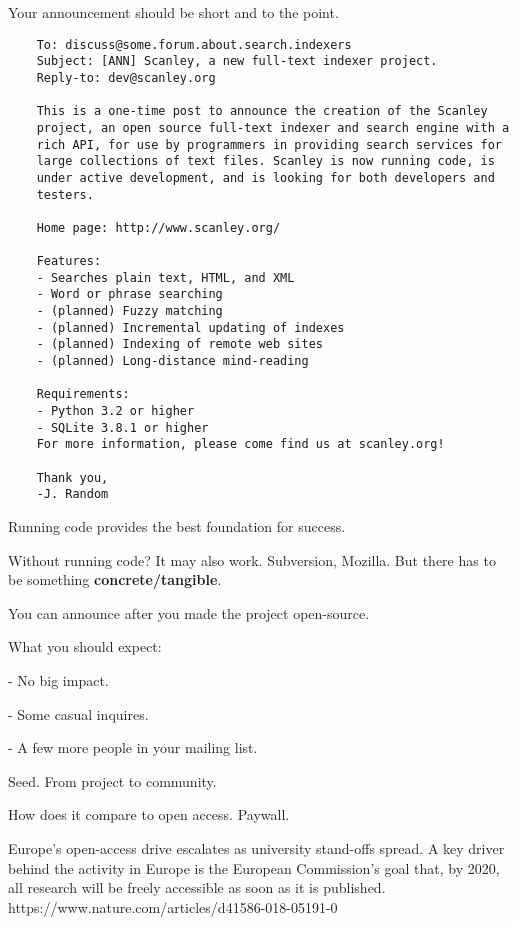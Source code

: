 \documentclass[landscape,30pt]{foils}
\begin{document}
Your announcement should be short and to the point.

{\tiny
\begin{verbatim}
    To: discuss@some.forum.about.search.indexers
    Subject: [ANN] Scanley, a new full-text indexer project.
    Reply-to: dev@scanley.org

    This is a one-time post to announce the creation of the Scanley
    project, an open source full-text indexer and search engine with a
    rich API, for use by programmers in providing search services for
    large collections of text files. Scanley is now running code, is
    under active development, and is looking for both developers and
    testers.

    Home page: http://www.scanley.org/

    Features:
    - Searches plain text, HTML, and XML
    - Word or phrase searching
    - (planned) Fuzzy matching
    - (planned) Incremental updating of indexes
    - (planned) Indexing of remote web sites
    - (planned) Long-distance mind-reading

    Requirements:
    - Python 3.2 or higher
    - SQLite 3.8.1 or higher
    For more information, please come find us at scanley.org!

    Thank you,
    -J. Random
\end{verbatim}
}

Running code provides the best foundation for success.

Without running code?  It may also work.  Subversion, Mozilla.   But there has to be something {\bf concrete/tangible}.

You can announce after you made the project open-source.

What you should expect:

- No big impact.

- Some casual inquires.

- A few more people in your mailing list.

Seed.  From project to community.


How does it compare to open access.  Paywall.

Europe’s open-access drive escalates as university stand-offs spread.  A key driver behind the activity in Europe is the European Commission’s goal that, by 2020, all research will be freely accessible as soon as it is published.  https://www.nature.com/articles/d41586-018-05191-0
\end{document}
